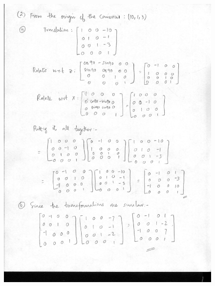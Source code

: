 \documentclass{article}
\begin{document}
\begin{figure}
\includegraphics[width=15cm]{2.jpg}
\end{figure}
\end{document}
